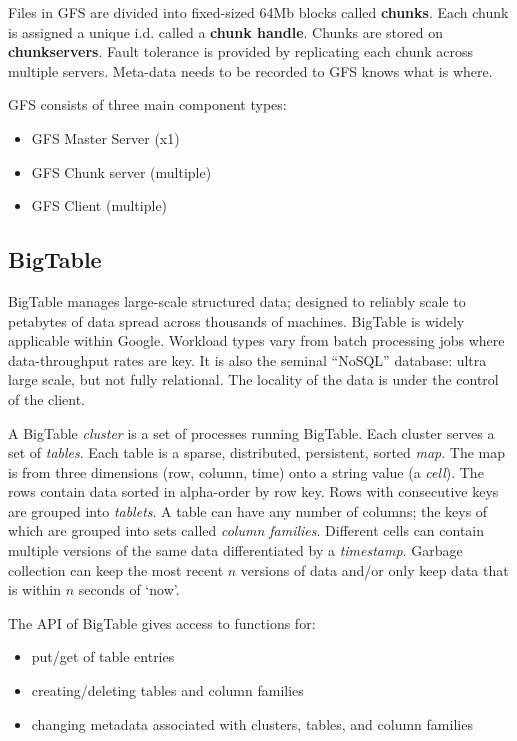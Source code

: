 \documentclass[11pt,a4paper,titlepage,dvipsnames,cmyk]{scrartcl}
\begin{document}
Files in GFS are divided into fixed-sized 64Mb blocks called \textbf{chunks}. Each chunk is assigned a unique i.d. called a \textbf{chunk handle}. Chunks are stored on \textbf{chunkservers}. Fault tolerance is provided by replicating each chunk across multiple servers. Meta-data needs to be recorded to GFS knows what is where.

GFS consists of three main component types:
\begin{itemize}
    \item GFS Master Server (x1)
    \item GFS Chunk server (multiple)
    \item GFS Client (multiple)
\end{itemize}

\subsection{BigTable}
BigTable manages large-scale structured data; designed to reliably scale to petabytes of data spread across thousands of machines. BigTable is widely applicable within Google. Workload types vary from batch processing jobs where data-throughput rates are key. It is also the seminal ``NoSQL'' database: ultra large scale, but not fully relational. The locality of the data is under the control of the client.

A BigTable \textit{cluster} is a set of processes running BigTable. Each cluster serves a set of \textit{tables}. Each table is a sparse, distributed, persistent, sorted \textit{map}. The map is from three dimensions (row, column, time) onto a string value (a \textit{cell}). The rows contain data sorted in alpha-order by row key. Rows with consecutive keys are grouped into \textit{tablets}. A table can have any number of columns; the keys of which are grouped into sets called \textit{column families}. Different cells can contain multiple versions of the same data differentiated by a \textit{timestamp}. Garbage collection can keep the most recent $n$ versions of data and/or only keep data that is within $n$ seconds of `now'.

The API of BigTable gives access to functions for:
\begin{itemize}
    \item put/get of table entries
    \item creating/deleting tables and column families
    \item changing metadata associated with clusters, tables, and column families
\end{itemize}
\end{document}

